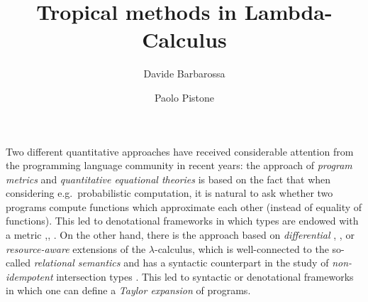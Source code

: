 \documentclass[submission,%
]{eptcs}
\title{Tropical methods in Lambda-Calculus}
\author{Davide Barbarossa
\institute{DISI, Universit\`a di Bologna}
\email{davide.barbarossa@unibo.it}
\and
\qquad\qquad Paolo Pistone
\institute{\qquad\qquad\qquad DISI, Universit\`a di Bologna}
\email{\qquad\qquad\qquad paolo.pistone@unibo.it}
}
\begin{document}
\maketitle



Two different quantitative approaches have received considerable attention from the programming language community in recent years: %
the approach of \emph{program metrics} \cite{Reed2010, Gaboardi2017, Gabo2019} and \emph{quantitative equational theories} \cite{Plotk} is based on the fact that when considering e.g.\ probabilistic %
computation, %
it is natural to ask whether two programs compute functions which %
approximate each other (instead of equality of functions).
This led to denotational frameworks in which types are endowed with a metric \cite{Reed2010},\cite{Bonchi2018}, \cite{Geoffroy2020, PistoneLICS, PistoneFSCD2022}.
On the other hand, there is the approach based on \emph{differential} \cite{difflambda}, \cite{difflambda}, \cite{Manzo2013, Breuvart2018, PistoneLICS2022} or \emph{resource-aware} \cite{Boudol1993} extensions of the $\lambda$-calculus, which is well-connected to the so-called \emph{relational semantics} \cite{Manzo2012, Manzo2013, dill} and has a syntactic counterpart in the study of \emph{non-idempotent} intersection types \cite{decarvalho2018, Mazza2016}.
This led to syntactic or denotational frameworks in which one can define a \emph{Taylor expansion} of programs.
\end{document}
